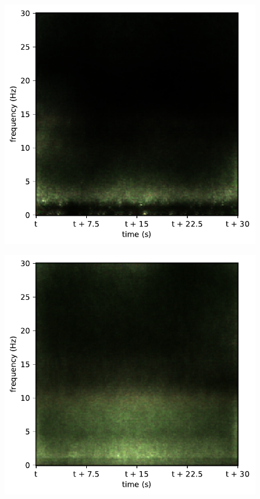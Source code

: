 \begin{subfigure}{.16\textwidth}
  \centering
  \includegraphics[width=1\linewidth]{./../Article/pics/class_master_4}
  \caption{}
  \label{fig_1_25}
\end{subfigure}%
\begin{subfigure}{.16\textwidth}
  \centering
  \includegraphics[width=1\linewidth]{./../Article/pics/class_master_5}
  \caption{}
  \label{fig_1_26}
\end{subfigure}


